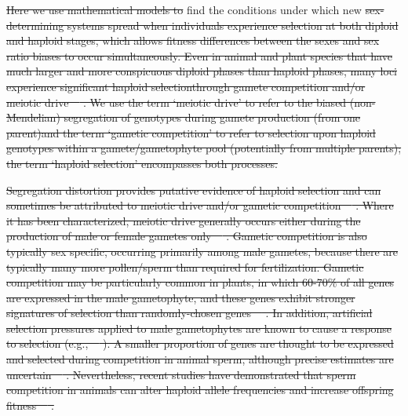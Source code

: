 \documentclass[10pt,letterpaper]{article}
\providecommand{\DIFaddtex}[1]{{\protect\color{blue}\uwave{#1}}} %
\providecommand{\DIFdeltex}[1]{{\protect\color{red}\sout{#1}}}                      %
\providecommand{\DIFaddbegin}{} %
\providecommand{\DIFaddend}{} %
\providecommand{\DIFdelbegin}{} %
\providecommand{\DIFdelend}{} %
\providecommand{\DIFadd}[1]{\texorpdfstring{\DIFaddtex{#1}}{#1}} %
\providecommand{\DIFdel}[1]{\texorpdfstring{\DIFdeltex{#1}}{}} %
\newcommand{\DIFscaledelfig}{0.5}
\newlength{\DIFdelgraphicswidth} %
\newlength{\DIFdelgraphicsheight} %
\newcommand{\DIFaddincludegraphics}[2][]{{\color{blue}\fbox{\DIFOincludegraphics[#1]{#2}}}} %
\newcommand{\DIFdelincludegraphics}[2][]{%
\sbox{\DIFdelgraphicsbox}{\DIFOincludegraphics[#1]{#2}}%
\settoboxwidth{\DIFdelgraphicswidth}{\DIFdelgraphicsbox} %
\settoboxtotalheight{\DIFdelgraphicsheight}{\DIFdelgraphicsbox} %
\scalebox{\DIFscaledelfig}{%
\parbox[b]{\DIFdelgraphicswidth}{\usebox{\DIFdelgraphicsbox}\\[-\baselineskip] \rule{\DIFdelgraphicswidth}{0em}}\llap{\resizebox{\DIFdelgraphicswidth}{\DIFdelgraphicsheight}{%
\setlength{\unitlength}{\DIFdelgraphicswidth}%
\begin{picture}(1,1)%
\thicklines\linethickness{2pt} %
{\color[rgb]{1,0,0}\put(0,0){\framebox(1,1){}}}%
{\color[rgb]{1,0,0}\put(0,0){\line( 1,1){1}}}%
{\color[rgb]{1,0,0}\put(0,1){\line(1,-1){1}}}%
\end{picture}%
}\hspace*{3pt}}} %
} %
\DeclareRobustCommand{\DIFaddbegin}{\DIFOaddbegin \let\includegraphics\DIFaddincludegraphics} %
\DeclareRobustCommand{\DIFaddend}{\DIFOaddend \let\includegraphics\DIFOincludegraphics} %
\DeclareRobustCommand{\DIFdelbegin}{\DIFOdelbegin \let\includegraphics\DIFdelincludegraphics} %
\DeclareRobustCommand{\DIFdelend}{\DIFOaddend \let\includegraphics\DIFOincludegraphics} %
\begin{document}
\DIFdelbegin \DIFdel{Here we use mathematical models to }\DIFdelend %
\DIFaddbegin \DIFadd{Here, we analytically }\DIFaddend find the conditions under which new \DIFdelbegin \DIFdel{sex-determining systems spread when individuals experience selection at both diploid and haploid stages, which allows fitness differences between the sexes and sex ratio biases to occur simultaneously. 
Even in animal and plant species that have much larger and more conspicuous diploid phases than haploid phases, many loci experience significant haploid selectionthrough gamete competition and/or meiotic drive~\mbox{%
\cite{Mulcahy:1996ha,JOSEPH:2004haa}}%
. 
We use the term `meiotic drive' to refer to the biased (non-Mendelian) segregation of genotypes during gamete production (from one parent)and the term `gametic competition' to refer to selection upon haploid genotypes within a gamete/gametophyte pool (potentially from multiple parents); the term `haploid selection' encompasses both processes.
}%

\DIFdel{Segregation distortion provides putative evidence of haploid selection and can sometimes be attributed to meiotic drive and/or gametic competition~\mbox{%
\cite{Lalanne2004,Fishman2005,Leppala2008,Leppala2013,Didion2015,Didion2016}}%
.
Where it has been characterized, meiotic drive generally occurs either during the production of male or female gametes only~\mbox{%
\cite{Ubeda:2005gw,Lindholm:2016cw}}%
.
Gametic competition is also typically sex specific, occurring primarily among male gametes, because there are typically many more pollen/sperm than required for fertilization.
Gametic competition may be particularly common in plants, in which 60-70\% of all genes are expressed in the male gametophyte, and these genes exhibit stronger signatures of selection than randomly-chosen genes~\mbox{%
\cite{Borg:2009jpa,Arunkumar:2013iq,Gossmann:2014dua}}%
.
In addition, artificial selection pressures applied to male gametophytes are known to cause a response to selection (e.g.,~\mbox{%
\cite{Hormaza:1996cv,Ravikumar:2003uo,Hedhly:2004iv,Clarke:2004ir}}%
). 
A smaller proportion of genes are thought to be expressed and selected during competition in animal sperm, although precise estimates are uncertain~\mbox{%
\cite{Zheng:2001fi,JOSEPH:2004haa,Vibranovski:2010et}}%
. 
Nevertheless, recent studies have demonstrated that sperm competition in animals can alter haploid allele frequencies and increase offspring fitness~\mbox{%
\cite{Immler:2014im,Alavioon2017}}%
.
}%
\end{document}
